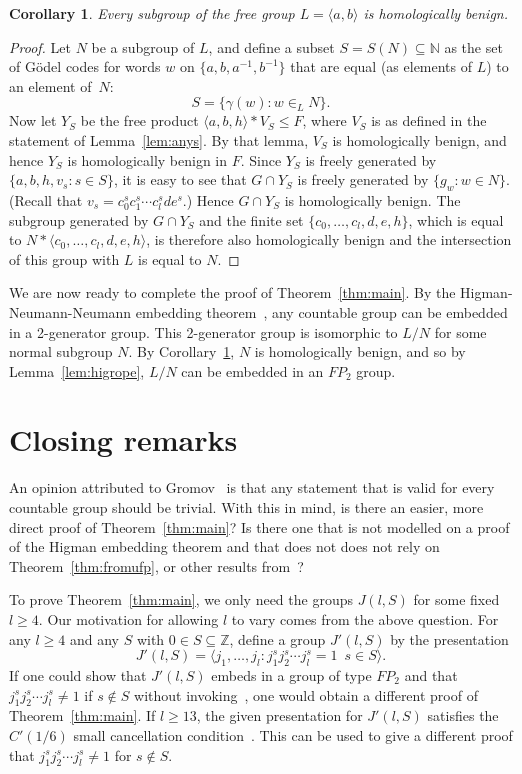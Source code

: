\documentclass[12pt,a4paper]{article}
\newtheorem{corollary}[theorem]{Corollary}
\newcommand{\nn}{{\mathbb N}}
\newcommand{\zz}{{\mathbb Z}}
\begin{document}
\begin{corollary}\label{cor:allbenign} 
Every subgroup of the free group $L=\langle a,b\rangle$ 
is homologically benign.  
\end{corollary} 

\begin{proof} 
Let $N$ be a subgroup of $L$, and define a subset $S=S(N)\subseteq \nn$ 
as the set of G\"odel codes for words $w$ on $\{a,b,a^{-1},b^{-1}\}$ that
are equal (as elements of $L$) to an element of~$N$: 
$$S=\{\gamma(w)\colon w \in_L N\}.$$  
Now let $Y_S$ be 
the free product $\langle a,b,h\rangle*V_S\leq F$, where $V_S$ is 
as defined in the statement of Lemma~\ref{lem:anys}.  By that lemma, 
$V_S$ is homologically benign, and hence $Y_S$ is homologically benign 
in $F$.  Since $Y_S$ is freely generated by $\{a,b,h,v_s\colon s\in S\}$, 
it is easy to see that $G\cap Y_S$ is freely generated by $\{g_w\colon
w\in N\}$.  (Recall that $v_s = c_0^sc_1^s\cdots c_l^sde^s$.)  Hence 
$G\cap Y_S$ is homologically benign.  The subgroup generated by 
$G \cap Y_S$ and the finite set $\{c_0,\ldots,c_l,d,e,h\}$, which 
is equal to $N*\langle c_0,\ldots,c_l,d,e,h\rangle$, is therefore also
homologically benign and the intersection of this group with $L$
is equal to $N$.  
\end{proof} 

We are now ready to complete the proof of Theorem~\ref{thm:main}.  By
the Higman-Neumann-Neumann embedding theorem~\cite{hnn,lynsch}, any countable
group can be embedded in a 2-generator group.  This 2-generator group
is isomorphic to $L/N$ for some normal subgroup $N$.  By
Corollary~\ref{cor:allbenign}, $N$ is homologically benign, and so by
Lemma~\ref{lem:higrope}, $L/N$ can be embedded in an $FP_2$ group.

\section{Closing remarks} 

An opinion attributed to Gromov~\cite[Ch.~1]{gdelah} is that any statement 
that is valid for every countable group should be trivial.  With this 
in mind, is there an easier, more direct proof of
Theorem~\ref{thm:main}?  Is there one that is not modelled on a proof 
of the Higman embedding theorem and that does not does not rely on 
Theorem~\ref{thm:fromufp}, or other results from~\cite{BB,ufp}?

To prove Theorem~\ref{thm:main}, we only need the groups $J(l,S)$ 
for some fixed $l\geq 4$.  Our motivation for allowing $l$ to vary 
comes from the above question.  For any $l\geq 4$ and any $S$ with $0\in
S\subseteq \zz$, define a group $J'(l,S)$ by the presentation 
\[J'(l,S) = \langle j_1,\ldots, j_l \colon j_1^sj_2^s\cdots j_l^s=1 \,\,\,
s\in S\rangle.\] 
If one could show that $J'(l,S)$ embeds in a group of type $FP_2$ 
and that $j_1^sj_2^s\cdots j_l^s\neq 1$ if $s\notin S$ without 
invoking~\cite{BB,ufp}, one would obtain a different proof of 
Theorem~\ref{thm:main}.  
If $l\geq 13$, the given presentation for $J'(l,S)$ satisfies 
the $C'(1/6)$ small cancellation condition~\cite[Ch.~5]{lynsch}.  
This can be used to give a different proof that 
$j_1^sj_2^s\cdots j_l^s\neq 1$ for $s\notin S$.  
\end{document}
